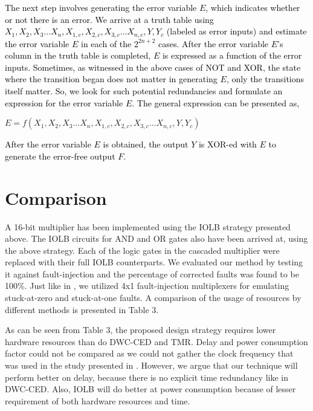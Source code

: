 \documentclass[10pt,journal,cspaper,compsoc]{IEEEtran}
\begin{document}
{\textcolor{black}{The next step involves generating the error variable $E$, which indicates whether or not there is an error. We arrive at a truth table using $X_1, X_2, X_3...X_n, X_{1,c}, X_{2,c}, X_{3,c}...X_{n,c}, Y, Y_c$ (labeled as error inputs) and estimate the error variable $E$ in each of the $2^{2n+2}$ cases. After the error variable $E$'s column in the truth table is completed, $E$ is expressed as a function of the error inputs. Sometimes, as witnessed in the above cases of NOT and XOR, the state where the transition began does not matter in generating $E$, only the transitions itself matter. So, we look for such potential redundancies and formulate an expression for the error variable $E$. The general expression can be presented as,\\}

$E = f(X_1, X_2, X_3...X_n, X_{1,c}, X_{2,c}, X_{3,c}...X_{n,c}, Y, Y_c)$\\

{\textcolor{black}{After the error variable $E$ is obtained, the output $Y$ is XOR-ed with $E$ to generate the error-free output $F$.}

\section{Comparison}\label{sec4}
A 16-bit multiplier has been implemented using the IOLB strategy presented above. The IOLB circuits for AND and OR gates also have been arrived at, using the above strategy. Each of the logic gates in the cascaded multiplier were replaced with their full IOLB counterparts. We evaluated our method by testing it against fault-injection and the percentage of corrected faults was found to be 100\%. Just like in \cite{KNHCR}, we utilized 4x1 fault-injection multiplexers for emulating stuck-at-zero and stuck-at-one faults. A comparison of the usage of resources by different methods is presented in Table 3.

As can be seen from Table 3, the proposed design strategy requires lower hardware resources than do DWC-CED and TMR. Delay and power consumption factor could not be compared as we could not gather the clock frequency that was used in the study presented in \cite{KNHCR}. However, we argue that our technique will perform better on delay, because there is no explicit time redundancy like in DWC-CED. Also, IOLB will do better at power consumption because of lesser requirement of both hardware resources and time.




}}
\end{document}
